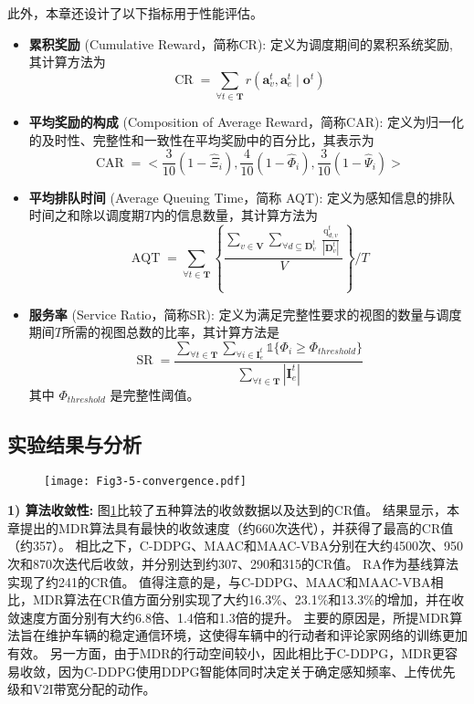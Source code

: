 此外，本章还设计了以下指标用于性能评估。
\begin{itemize}
	\item \textbf{累积奖励} (Cumulative Reward，简称CR): 定义为调度期间的累积系统奖励, 其计算方法为
		\begin{equation}
			\operatorname{CR} = \sum_{\forall t \in \mathbf{T}} r\left(\boldsymbol{a}_{v}^{t},\boldsymbol{a}_{e}^{t} \mid \boldsymbol{o}^{t}\right)
		\end{equation}
	\item \textbf{平均奖励的构成} (Composition of Average Reward，简称CAR): 定义为归一化的及时性、完整性和一致性在平均奖励中的百分比，其表示为
		\begin{equation}
			\operatorname{CAR} = <\frac{3}{10}(1-\hat{\Xi}_{i}),\frac{4}{10}(1-\hat{\Phi}_{i}), \frac{3}{10}(1-\hat{\Psi}_{i})>
		\end{equation}
	\item \textbf{平均排队时间} (Average Queuing Time，简称 AQT): 定义为感知信息的排队时间之和除以调度期$T$内的信息数量，其计算方法为 
		\begin{equation}
			\operatorname{AQT} =\sum_{\forall t \in \mathbf{T}} \left \{ \frac{\sum_{v \in \mathbf{V}} \sum_{\forall d \subseteq \mathbf{D}_{v}^t} \frac{\operatorname{q}_{d, v}^t}{|\mathbf{D}_{v}^t|} }{V} \right\} \bigg/ T
		\end{equation}
	\item \textbf{服务率} (Service Ratio，简称SR): 定义为满足完整性要求的视图的数量与调度期间$T$所需的视图总数的比率，其计算方法是 
		\begin{equation}
			\operatorname{SR} = \frac{\sum_{\forall t \in \mathbf{T}}\sum_{\forall i \in \mathbf{I}_e^t} \mathds{1}\{\Phi_{i} \geq \Phi_{threshold}\}}{ \sum_{\forall t \in \mathbf{T}} |\mathbf{I}_e^t|}
		\end{equation}
	其中 $\Phi_{threshold}$ 是完整性阈值。
\end{itemize}

\subsection{实验结果与分析}
\begin{figure}[h]
\centering
  \texttt{[image: Fig3-5-convergence.pdf]}
  \label{fig 3-5}
\end{figure} 

\textbf{1) 算法收敛性:}
图\ref{fig 3-5}比较了五种算法的收敛数据以及达到的CR值。
结果显示，本章提出的MDR算法具有最快的收敛速度（约660次迭代），并获得了最高的CR值（约357）。
相比之下，C-DDPG、MAAC和MAAC-VBA分别在大约4500次、950次和870次迭代后收敛，并分别达到约307、290和315的CR值。
RA作为基线算法实现了约241的CR值。
值得注意的是，与C-DDPG、MAAC和MAAC-VBA相比，MDR算法在CR值方面分别实现了大约16.3\%、23.1\%和13.3\%的增加，并在收敛速度方面分别有大约6.8倍、1.4倍和1.3倍的提升。
主要的原因是，所提MDR算法旨在维护车辆的稳定通信环境，这使得车辆中的行动者和评论家网络的训练更加有效。
另一方面，由于MDR的行动空间较小，因此相比于C-DDPG，MDR更容易收敛，因为C-DDPG使用DDPG智能体同时决定关于确定感知频率、上传优先级和V2I带宽分配的动作。


